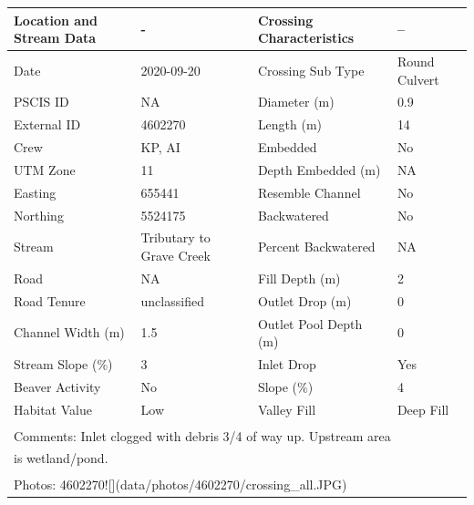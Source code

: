 \documentclass[
]{book}
\begin{document}
\begin{tabular}{llll}
\toprule
Location and Stream Data & - & Crossing Characteristics & --\\
\midrule
Date & 2020-09-20 & Crossing Sub Type & Round Culvert\\
PSCIS ID & NA & Diameter (m) & 0.9\\
External ID & 4602270 & Length (m) & 14\\
Crew & KP, AI & Embedded & No\\
UTM Zone & 11 & Depth Embedded (m) & NA\\
\addlinespace
Easting & 655441 & Resemble Channel & No\\
Northing & 5524175 & Backwatered & No\\
Stream & Tributary to Grave Creek & Percent Backwatered & NA\\
Road & NA & Fill Depth (m) & 2\\
Road Tenure & unclassified & Outlet Drop (m) & 0\\
\addlinespace
Channel Width (m) & 1.5 & Outlet Pool Depth (m) & 0\\
Stream Slope (\%) & 3 & Inlet Drop & Yes\\
Beaver Activity & No & Slope (\%) & 4\\
Habitat Value & Low & Valley Fill & Deep Fill\\
\bottomrule
\multicolumn{4}{l}{\textsuperscript{} Comments: Inlet clogged with debris 3/4 of way up. Upstream area}\\
\multicolumn{4}{l}{is wetland/pond.}\\
\multicolumn{4}{l}{\textsuperscript{} Photos: 4602270![](data/photos/4602270/crossing\_all.JPG)}\\
\end{tabular}
\end{document}
